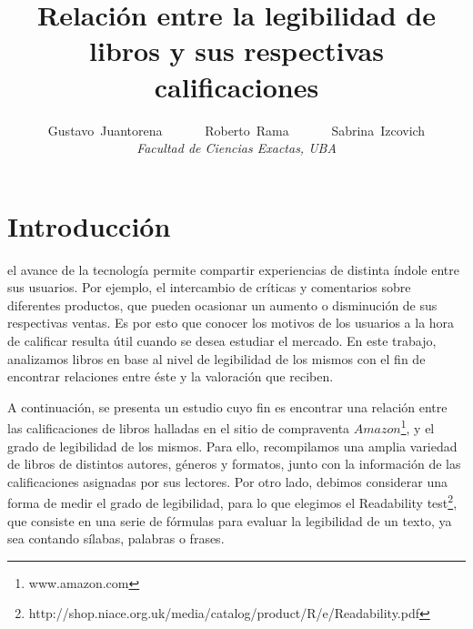 \documentclass[12pt,journal,compsoc]{IEEEtran}
\begin{document}
\title{Relación entre la legibilidad de libros y sus respectivas calificaciones}

\author{Gustavo~Juantorena~~~~~~
        Roberto~Rama~~~~~~
        Sabrina~Izcovich\\
        \textit{Facultad de Ciencias Exactas, UBA}}



\maketitle
\IEEEdisplaynontitleabstractindextext
\IEEEpeerreviewmaketitle

\section{Introducción}
 el avance de la tecnología permite compartir experiencias de distinta índole entre sus usuarios. Por ejemplo, el intercambio de críticas y comentarios sobre diferentes productos, que pueden ocasionar un aumento o disminución de sus respectivas ventas. Es por esto que conocer los motivos de los usuarios a la hora de calificar resulta útil cuando se desea estudiar el mercado. En este trabajo, analizamos libros en base al nivel de legibilidad de los mismos con el fin de encontrar relaciones entre éste y la valoración que reciben. 

A continuación, se presenta un estudio cuyo fin es encontrar una relación entre las calificaciones de libros halladas en el sitio de compraventa $Amazon$\footnote{www.amazon.com}, y el grado de legibilidad de los mismos. Para ello, recompilamos una amplia variedad de libros de distintos autores, géneros y formatos, junto con la información de las calificaciones asignadas por sus lectores. Por otro lado, debimos considerar una forma de medir el grado de legibilidad, para lo que elegimos el Readability test\footnote{http://shop.niace.org.uk/media/catalog/product/R/e/Readability.pdf}, que consiste en una serie de fórmulas para evaluar la legibilidad de un texto, ya sea contando sílabas, palabras o frases.
\end{document}
